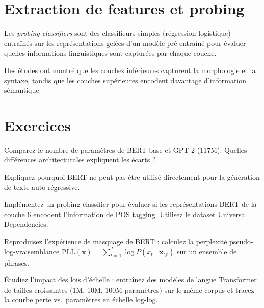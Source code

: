 \section{Extraction de features et probing}
\label{sec:pre:probing}

\begin{definition}
Les \emph{probing classifiers} sont des classifieurs simples (r\'egression
logistique) entra\^in\'es sur les repr\'esentations gel\'ees d'un mod\`ele
pr\'e-entra\^in\'e pour \'evaluer quelles informations linguistiques sont
captur\'ees par chaque couche.
\end{definition}

Des \'etudes ont montr\'e que les couches inf\'erieures capturent la morphologie
et la syntaxe, tandis que les couches sup\'erieures encodent davantage
d'information s\'emantique.

\section{Exercices}
\label{sec:pre:exercices}

\begin{exercice}[$\star$]
Comparez le nombre de param\`etres de BERT-base et GPT-2 (117M). Quelles
diff\'erences architecturales expliquent les \'ecarts ?
\end{exercice}

\begin{exercice}[$\star$]
Expliquez pourquoi BERT ne peut pas \^etre utilis\'e directement pour la
g\'en\'eration de texte auto-r\'egressive.
\end{exercice}

\begin{exercice}[$\star\star$]
Impl\'ementez un probing classifier pour \'evaluer si les repr\'esentations
BERT de la couche 6 encodent l'information de POS tagging. Utilisez le
dataset Universal Dependencies.
\end{exercice}

\begin{exercice}[$\star\star$]
Reproduisez l'exp\'erience de masquage de BERT : calculez la perplexit\'e
pseudo-log-vraisemblance $\text{PLL}(\mathbf{x}) = \sum_{t=1}^{T} \log P(x_t \mid \mathbf{x}_{\setminus t})$
sur un ensemble de phrases.
\end{exercice}

\begin{exercice}[$\star\star\star$]
\'Etudiez l'impact des lois d'\'echelle : entra\^inez des mod\`eles de langue
Transformer de tailles croissantes (1M, 10M, 100M param\`etres) sur le m\^eme
corpus et tracez la courbe perte vs.\ param\`etres en \'echelle log-log.
\end{exercice}
